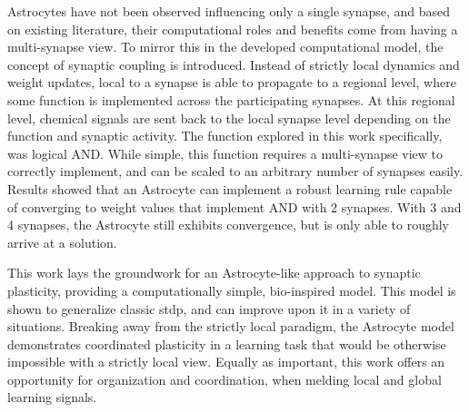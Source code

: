 Astrocytes have not been observed influencing only a single synapse, and based
on existing literature, their computational roles and benefits come from having
a multi-synapse view. To mirror this in the developed computational model, the
concept of synaptic coupling is introduced. Instead of strictly local dynamics
and weight updates, \ca local to a synapse is able to propagate to a regional
level, where some function is implemented across the participating synapses. At
this regional level, chemical signals are sent back to the local synapse level
depending on the function and synaptic activity. The function explored in this
work specifically, was logical AND. While simple, this function requires a
multi-synapse view to correctly implement, and can be scaled to an arbitrary
number of synapses easily. Results showed that an Astrocyte can implement a
robust learning rule capable of converging to weight values that implement AND
with 2 synapses. With 3 and 4 synapses, the Astrocyte still exhibits
convergence, but is only able to roughly arrive at a solution.

This work lays the groundwork for an Astrocyte-like approach to synaptic
plasticity, providing a computationally simple, bio-inspired model. This model
is shown to generalize classic \Gls{stdp}, and can improve upon it in a variety
of situations. Breaking away from the strictly local paradigm, the Astrocyte
model demonstrates coordinated plasticity in a learning task that would be
otherwise impossible with a strictly local view. Equally as important, this work
offers an opportunity for organization and coordination, when melding local and
global learning signals.
